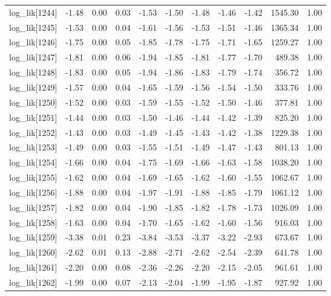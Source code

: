 \begin{table}[ht]
\begin{tabular}{rrrrrrrrrrr}
  log\_lik[1244] & -1.48 & 0.00 & 0.03 & -1.53 & -1.50 & -1.48 & -1.46 & -1.42 & 1545.30 & 1.00 \\ 
  log\_lik[1245] & -1.53 & 0.00 & 0.04 & -1.61 & -1.56 & -1.53 & -1.51 & -1.46 & 1365.34 & 1.00 \\ 
  log\_lik[1246] & -1.75 & 0.00 & 0.05 & -1.85 & -1.78 & -1.75 & -1.71 & -1.65 & 1259.27 & 1.00 \\ 
  log\_lik[1247] & -1.81 & 0.00 & 0.06 & -1.94 & -1.85 & -1.81 & -1.77 & -1.70 & 489.38 & 1.00 \\ 
  log\_lik[1248] & -1.83 & 0.00 & 0.05 & -1.94 & -1.86 & -1.83 & -1.79 & -1.74 & 356.72 & 1.00 \\ 
  log\_lik[1249] & -1.57 & 0.00 & 0.04 & -1.65 & -1.59 & -1.56 & -1.54 & -1.50 & 333.76 & 1.00 \\ 
  log\_lik[1250] & -1.52 & 0.00 & 0.03 & -1.59 & -1.55 & -1.52 & -1.50 & -1.46 & 377.81 & 1.00 \\ 
  log\_lik[1251] & -1.44 & 0.00 & 0.03 & -1.50 & -1.46 & -1.44 & -1.42 & -1.39 & 825.20 & 1.00 \\ 
  log\_lik[1252] & -1.43 & 0.00 & 0.03 & -1.49 & -1.45 & -1.43 & -1.42 & -1.38 & 1229.38 & 1.00 \\ 
  log\_lik[1253] & -1.49 & 0.00 & 0.03 & -1.55 & -1.51 & -1.49 & -1.47 & -1.43 & 801.13 & 1.00 \\ 
  log\_lik[1254] & -1.66 & 0.00 & 0.04 & -1.75 & -1.69 & -1.66 & -1.63 & -1.58 & 1038.20 & 1.00 \\ 
  log\_lik[1255] & -1.62 & 0.00 & 0.04 & -1.69 & -1.65 & -1.62 & -1.60 & -1.55 & 1062.67 & 1.00 \\ 
  log\_lik[1256] & -1.88 & 0.00 & 0.04 & -1.97 & -1.91 & -1.88 & -1.85 & -1.79 & 1061.12 & 1.00 \\ 
  log\_lik[1257] & -1.82 & 0.00 & 0.04 & -1.90 & -1.85 & -1.82 & -1.78 & -1.73 & 1026.09 & 1.00 \\ 
  log\_lik[1258] & -1.63 & 0.00 & 0.04 & -1.70 & -1.65 & -1.62 & -1.60 & -1.56 & 916.03 & 1.00 \\ 
  log\_lik[1259] & -3.38 & 0.01 & 0.23 & -3.84 & -3.53 & -3.37 & -3.22 & -2.93 & 673.67 & 1.00 \\ 
  log\_lik[1260] & -2.62 & 0.01 & 0.13 & -2.88 & -2.71 & -2.62 & -2.54 & -2.39 & 641.78 & 1.00 \\ 
  log\_lik[1261] & -2.20 & 0.00 & 0.08 & -2.36 & -2.26 & -2.20 & -2.15 & -2.05 & 961.61 & 1.00 \\ 
  log\_lik[1262] & -1.99 & 0.00 & 0.07 & -2.13 & -2.04 & -1.99 & -1.95 & -1.87 & 927.92 & 1.00 \\ 

\end{tabular}
\end{table}
